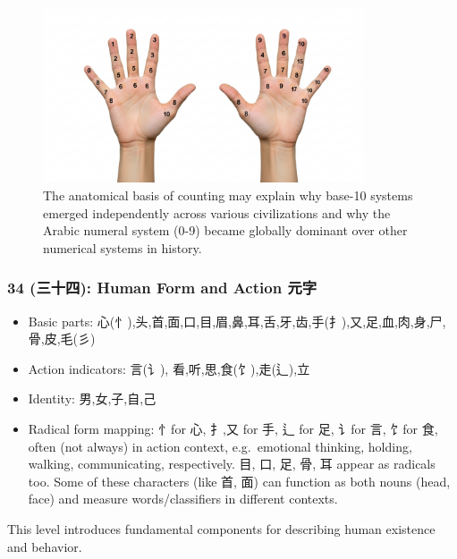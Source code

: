 \documentclass[11pt,letterpaper]{article}
\begin{document}
\begin{figure}
\centering
\includegraphics[width=0.85\textwidth]{./images/10-fingers.jpg}
\caption{The anatomical basis of counting may explain why base-10
systems emerged independently across various civilizations and why the
Arabic numeral system (0-9) became globally dominant over other
numerical systems in history.}
\end{figure}

\subsubsection{34 (三十四): Human Form and Action 元字} 
  

  \begin{itemize}
  \tightlist
  \item
    Basic parts:
    心(忄),头,首,面,口,目,眉,鼻,耳,舌,牙,齿,手(扌),又,足,血,肉,身,尸,骨,皮,毛(彡)
  \item
    Action indicators: 言(讠), 看,听,思,食(饣),走(辶),立
  \item
    Identity: 男,女,子,自,己
  \item
    Radical form mapping: 忄for 心, 扌,又 for 手, 辶 for 足, 讠for 言,
    饣for 食, often (not always) in action context, e.g.~emotional
    thinking, holding, walking, communicating, respectively. 目, 口, 足,
    骨, 耳 appear as radicals too. Some of these characters (like 首,
    面) can function as both nouns (head, face) and measure
    words/classifiers in different contexts.
  \end{itemize}

This level introduces fundamental components for describing human
existence and behavior.
\end{document}
